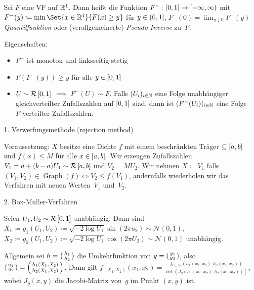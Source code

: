 \documentclass{cheat-sheet}
\newcommand{\Uniform}{\mathcal{R}} %
\DeclareMathOperator{\Graph}{Graph} %
\newcommand{\Normal}{\mathcal{N}} %
\begin{document}
Sei $F$ eine VF auf $\mathbb{R}^1$.
Dann heißt die Funktion $F^{-} : \left[ 0, 1 \right] \to \left[ -\infty, \infty \right)$ mit $F^{-}(y) \coloneqq \min \Set{x \in \R^1}{F(x) \geq y}$ für $y \in \left( 0, 1 \right]$, $F^{-}(0) = \lim_{y \downarrow 0} F^{-}(y)$ \emph{Quantilfunktion} oder (verallgemeinerte) \emph{Pseudo-Inverse} zu~$F$.

Eigenschaften:

\begin{itemize}
  \item $F^{-}$ ist monoton und linksseitig stetig
  \item $F(F^{-}(y)) \geq y$ für alle $y \in \left[ 0, 1 \right]$
  \item $U \sim \Uniform \cinterval{0}{1}$ $\implies$ $F^{-}(U) \sim F$.
  Falls $(U_i)_{i \in \mathbb{N}}$ eine Folge unabhängiger gleichverteilter Zufallszahlen auf $\left[ 0, 1 \right]$ sind, dann ist $(F^{-}(U_i))_{i \in \mathbb{N}}$ eine Folge $F$-verteilter Zufallszahlen.
\end{itemize}



1. Verwerfungsmethode (rejection method)

Voraussetzung: $X$ besitze eine Dichte $f$ mit einem beschränkten Träger $\subseteq \left[ a, b \right]$ und $f(x) \leq M$ für alle $x \in \left[ a, b \right]$.
Wir erzeugen Zufallszahlen $V_1 = a + (b-a) U_1 \sim \Uniform \cinterval{a}{b}$ und $V_2 = M U_2$.
Wir nehmen $X \coloneqq V_1$ falls $(V_1, V_2) \in \Graph(f) \iff V_2 \leq f(V_1)$, andernfalls wiederholen wir das Verfahren mit neuen Werten~$V_1$ und~$V_2$.


2. Box-Muller-Verfahren

Seien $U_1, U_2 \sim \Uniform \cinterval{0}{1}$ unabhängig.
Dann sind $X_1 \coloneqq g_1(U_1, U_2) \coloneqq \sqrt{- 2 \log U_1} \sin(2 \pi u_2) \sim \Normal(0, 1)$, $X_2 \coloneqq g_2(U_1, U_2) \coloneqq \sqrt{- 2 \log U_1} \cos(2 \pi U_2) \sim \Normal(0, 1)$ unabhängig.

Allgemein sei $h = \begin{psmallmatrix} h_1 \\ h_2 \end{psmallmatrix}$ die Umkehrfunktion von $g = \begin{psmallmatrix}
  g_1 \\ g_2
\end{psmallmatrix}$, also $\begin{psmallmatrix}
  u_1 \\ u_2
\end{psmallmatrix} = \begin{psmallmatrix}
  h_1(X_1, X_2) \\ h_2(X_1, X_2)
\end{psmallmatrix}$.
Dann gilt $f_{(X_1, X_2)}(x_1, x_2) = \frac{f_{U_1, U_2}(h_1(x_1, x_2), h_2(x_1, x_2))}{\det(J_g (h_1(x_1, x_2), h_2(x_1, x_2)))}$,
wobei $J_g (x, y)$ die Jacobi-Matrix von~$g$ im Punkt $(x, y)$ ist.
\end{document}
